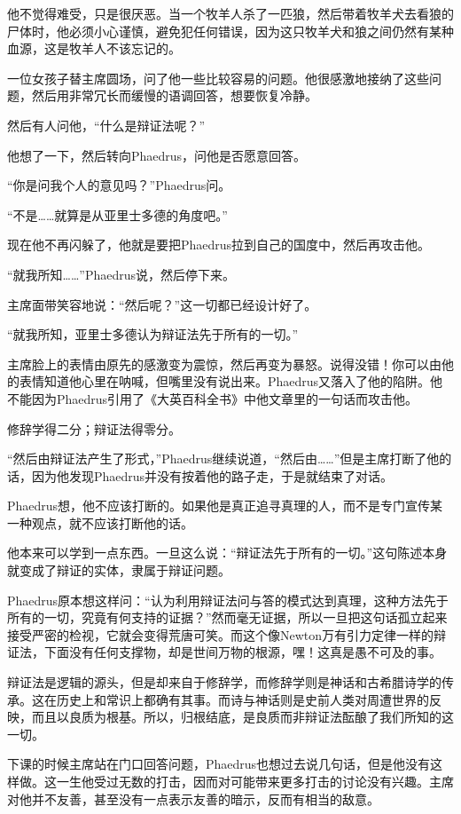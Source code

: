 \documentclass[UTF8]{article}
\begin{document}
\par 他不觉得难受，只是很厌恶。当一个牧羊人杀了一匹狼，然后带着牧羊犬去看狼的尸体时，他必须小心谨慎，避免犯任何错误，因为这只牧羊犬和狼之间仍然有某种血源，这是牧羊人不该忘记的。
\par 一位女孩子替主席圆场，问了他一些比较容易的问题。他很感激地接纳了这些问题，然后用非常冗长而缓慢的语调回答，想要恢复冷静。
\par 然后有人问他，“什么是辩证法呢？”
\par 他想了一下，然后转向Phaedrus，问他是否愿意回答。
\par “你是问我个人的意见吗？”Phaedrus问。
\par “不是……就算是从亚里士多德的角度吧。”
\par 现在他不再闪躲了，他就是要把Phaedrus拉到自己的国度中，然后再攻击他。
\par “就我所知……”Phaedrus说，然后停下来。
\par 主席面带笑容地说：“然后呢？”这一切都已经设计好了。
\par “就我所知，亚里士多德认为辩证法先于所有的一切。”
\par 主席脸上的表情由原先的感激变为震惊，然后再变为暴怒。说得没错！你可以由他的表情知道他心里在呐喊，但嘴里没有说出来。Phaedrus又落入了他的陷阱。他不能因为Phaedrus引用了《大英百科全书》中他文章里的一句话而攻击他。
\par 修辞学得二分；辩证法得零分。
\par “然后由辩证法产生了形式，”Phaedrus继续说道，“然后由……”但是主席打断了他的话，因为他发现Phaedrus并没有按着他的路子走，于是就结束了对话。
\par Phaedrus想，他不应该打断的。如果他是真正追寻真理的人，而不是专门宣传某一种观点，就不应该打断他的话。
\par 他本来可以学到一点东西。一旦这么说：“辩证法先于所有的一切。”这句陈述本身就变成了辩证的实体，隶属于辩证问题。
\par Phaedrus原本想这样问：“认为利用辩证法问与答的模式达到真理，这种方法先于所有的一切，究竟有何支持的证据？”然而毫无证据，所以一旦把这句话孤立起来接受严密的检视，它就会变得荒唐可笑。而这个像Newton万有引力定律一样的辩证法，下面没有任何支撑物，却是世间万物的根源，嘿！这真是愚不可及的事。
\par 辩证法是逻辑的源头，但是却来自于修辞学，而修辞学则是神话和古希腊诗学的传承。这在历史上和常识上都确有其事。而诗与神话则是史前人类对周遭世界的反映，而且以良质为根基。所以，归根结底，是良质而非辩证法酝酿了我们所知的这一切。
\par 下课的时候主席站在门口回答问题，Phaedrus也想过去说几句话，但是他没有这样做。这一生他受过无数的打击，因而对可能带来更多打击的讨论没有兴趣。主席对他并不友善，甚至没有一点表示友善的暗示，反而有相当的敌意。
\end{document}
